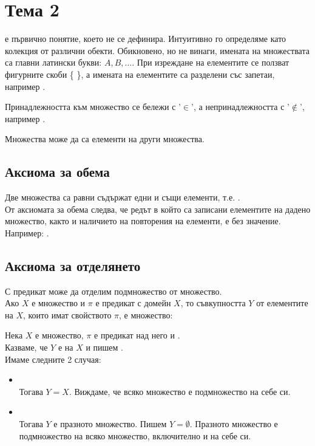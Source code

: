 \section{Тема 2}

 е първично понятие, което не се дефинира. Интуитивно го определяме като колекция от
различни обекти. Обикновено, но не винаги, имената на множествата са главни латински букви: \(A, B, ...\).
При изреждане на елементите се ползват фигурните скоби \{  \}, а имената на елементите са разделени със
запетаи, например .

Принадлежността към множество се бележи с '\(\in\)', а непринадлежността с '\(\not \in\)', например
.

Множества може да са елементи на други множества.

\subsection{Аксиома за обема}
Две множества са равни \totw съдържат едни и същи елементи, т.е. 
. \\

От аксиомата за обема следва, че редът в който са записани елементите на дадено множество, както и 
наличието на повторения на елементи, е без значение.
Например: .

\subsection{Аксиома за отделянето}
С предикат може да отделим подмножество от множество. \\

Ако \(X\) е множество и \(\pi\) е предикат с домейн \(X\), то съвкупността \(Y\) от елементите на \(X\), които
имат свойството \(\pi\), е множество: \\

Нека \(X\) е множество, \(\pi\) е предикат над него и . \\
Казваме, че \(Y\) е  на \(X\) и пишем . \\
Имаме следните 2 случая:
\begin{itemize}
    \item {} \\
    Тогава \(Y = X\). Виждаме, че всяко множество е подмножество на себе си.
    \item {} \\
    Тогава \(Y\) е празното множество. Пишем \(Y = \emptyset\). Празното множество е подмножество на всяко
    множество, включително и на себе си.
\end{itemize}

